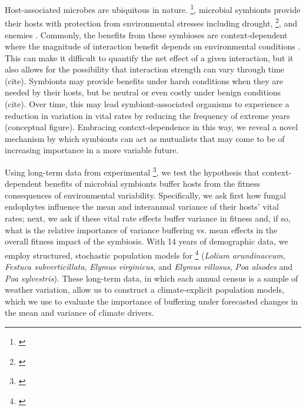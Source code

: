 \documentclass[9pt,twocolumn,twoside,lineno]{pnas-new}
\newcommand{\tom}[2]{{\color{red}{#1}}\footnote{\textit{\color{red}{#2}}}}
\begin{document}
Host-associated microbes are ubiquitous in nature. \tom{Across a broad range of taxa}{You only cite one paper on plant-fungal interactions -- so not very convincing as a broad range of taxa}, microbial symbionts provide their hosts with protection from environmental stresses including drought, \tom{temperature}{Temperature \emph{per se} is not a stress.}, and enemies \cite{kivlin2013fungal}. Commonly, the benefits from these symbioses are context-dependent where the magnitude of interaction benefit depends on environmental conditions \cite{chamberlain2014context}. This can make it difficult to quantify the net effect of a given interaction, but it also allows for the possibility that interaction strength can vary through time (cite). Symbionts may provide benefits under harsh conditions when they are needed by their hosts, but be neutral or even costly under benign conditions (cite). Over time, this may lead symbiont-associated organisms to experience a reduction in variation in vital rates by reducing the frequency of extreme years (conceptual figure). Embracing context-dependence in this way, we reveal a novel mechanism by which symbionts can act as mutualists that may come to be of increasing importance in a more variable future.

Using long-term data from experimental \tom{grass-fungal endophyte plots}{This needs context. No one will know what this means.}, we test the hypothesis that context-dependent benefits of microbial symbionts buffer hosts from the fitness consequences of environmental variability. Specifically, we ask first how fungal endophytes influence the mean and interannual variance of their hosts' vital rates; next, we ask if these vital rate effects buffer variance in fitness and, if so, what is the relative importance of variance buffering vs. mean effects in the overall fitness impact of the symbiosis.  With 14 years of demographic data, we employ structured, stochastic population models for \tom{seven species of cool-season grass hosts that are commonly infected with fungal endophytes}{I think we need a more thorough description of the experiment here - it's a novel experiment, at least in temporal scale, so we will want to sell it.} (\textit{Lolium arundinaceum}, \textit{Festuca subverticillata}, \textit{Elymus virginicus}, and \textit{Elymus villosus}, \textit{Poa alsodes} and \textit{Poa sylvestris}). These long-term data, in which each annual census is a sample of weather variation, allow us to construct a climate-explicit population models, which we use to evaluate the importance of buffering under forecasted changes in the mean and variance of climate drivers. 
\end{document}

